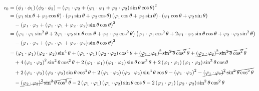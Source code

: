 \documentclass[11pt]{article}
\begin{document}
\begin{align*}
c_0 &= \left( \phi_1 \cdot \phi_1 \right)\left( \phi_2 \cdot \phi_2 \right) - \left( \varphi_1\cdot\varphi_2 + \left( \varphi_1\cdot\varphi_1 + \varphi_2\cdot\varphi_2 \right) \sin \theta \cos \theta \right)^2 \\
    &= \left( \varphi_1 \sin \theta + \varphi_2 \cos \theta \right) \cdot \left( \varphi_1 \sin \theta + \varphi_2 \cos \theta \right) \left( \varphi_1 \cos \theta + \varphi_2 \sin \theta \right) \cdot \left( \varphi_1 \cos \theta + \varphi_2 \sin \theta \right) \\
    & \quad - \left( \varphi_1\cdot\varphi_2 + \left( \varphi_1\cdot\varphi_1 + \varphi_2\cdot\varphi_2 \right) \sin \theta \cos \theta \right)^2 \\
    &= \left( \varphi_1 \cdot \varphi_1 \sin^2 \theta + 2 \varphi_1 \cdot \varphi_2 \sin \theta \cos \theta + \varphi_2 \cdot \varphi_2 \cos^2 \theta \right) \left( \varphi_1 \cdot \varphi_1 \cos^2 \theta + 2 \varphi_1 \cdot \varphi_2 \sin \theta \cos \theta + \varphi_2 \cdot \varphi_2 \sin^2 \theta \right) \\
    & \quad - \left( \varphi_1\cdot\varphi_2 + \left( \varphi_1\cdot\varphi_1 + \varphi_2\cdot\varphi_2 \right) \sin \theta \cos \theta \right)^2 \\
    &= \left( \varphi_1\cdot\varphi_1 \right) \left( \varphi_2\cdot\varphi_2 \right) \sin^4 \theta + \left( \varphi_1\cdot\varphi_1 \right) \left( \varphi_2\cdot\varphi_2 \right) \cos^4 \theta + \cancel{\left( \varphi_1\cdot\varphi_1 \right)^2 \sin^2 \theta \cos^2 \theta} + \cancel{\left( \varphi_2\cdot\varphi_2 \right)^2 \sin^2 \theta \cos^2 \theta} \\
    & \quad + 4 \left( \varphi_1\cdot\varphi_2 \right)^2 \sin^2 \theta \cos^2 \theta + 2 \left( \varphi_1\cdot\varphi_1 \right) \left( \varphi_1\cdot\varphi_2 \right) \sin \theta \cos^3 \theta + 2 \left( \varphi_1\cdot\varphi_1 \right) \left( \varphi_1\cdot\varphi_2 \right) \sin^3 \theta \cos \theta \\
    & \quad + 2 \left( \varphi_1\cdot\varphi_2 \right) \left( \varphi_2\cdot\varphi_2 \right) \sin \theta \cos^3 \theta + 2 \left( \varphi_1\cdot\varphi_2 \right) \left( \varphi_2\cdot\varphi_2 \right) \sin^3 \theta \cos \theta - \left( \varphi_1\cdot\varphi_2 \right)^2 - \cancel{\left( \varphi_1\cdot\varphi_1 \right)^2 \sin^2 \theta \cos^2 \theta} \\
    & \quad - \cancel{\left( \varphi_2\cdot\varphi_2 \right)^2 \sin^2 \theta \cos^2 \theta} - 2 \left( \varphi_1\cdot\varphi_1 \right) \left( \varphi_1\cdot\varphi_2 \right) \sin \theta \cos \theta - 2 \left( \varphi_1\cdot\varphi_1 \right) \left( \varphi_2\cdot\varphi_2 \right) \sin^2 \theta \cos^2 \theta \\

\end{align*}
\end{document}
